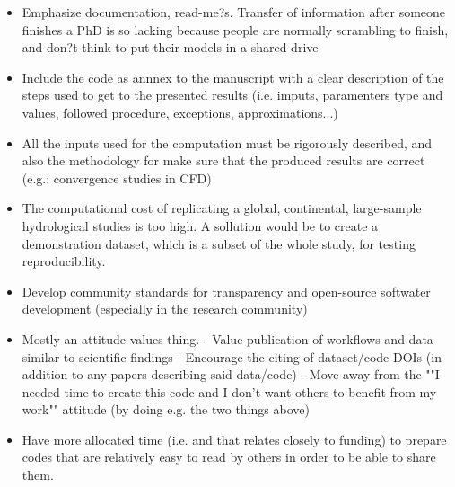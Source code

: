 \documentclass{article}
\begin{document}
\begin{itemize}
	\item Emphasize documentation, read-me?s. Transfer of information after someone finishes a PhD is so lacking because people are normally scrambling to finish, and don?t think to put their models in a shared drive
	\item Include the code as annnex to the manuscript with a clear description of the steps used to get to the presented results (i.e. imputs, paramenters type and values, followed procedure, exceptions, approximations...)
	\item All the inputs used for the computation must be rigorously described, and also the methodology for make sure that the produced results are correct (e.g.: convergence studies in CFD)
	\item The computational cost of replicating a global, continental, large-sample hydrological studies is too high. A sollution would be to create a demonstration dataset, which is a subset of the whole study, for testing reproducibility.
	\item Develop community standards for transparency and open-source softwater development (especially in the research community)
	\item Mostly an attitude  values thing. - Value publication of workflows and data similar to scientific findings - Encourage the citing of dataset/code DOIs (in addition to any papers describing said data/code) - Move away from the ""I needed time to create this code and I don't want others to benefit from my work"" attitude (by doing e.g. the two things above)
	\item Have more allocated time (i.e. and that relates closely to funding) to prepare codes that are relatively easy to read by others in order to be able to share them.
\end{itemize}
\end{document}
